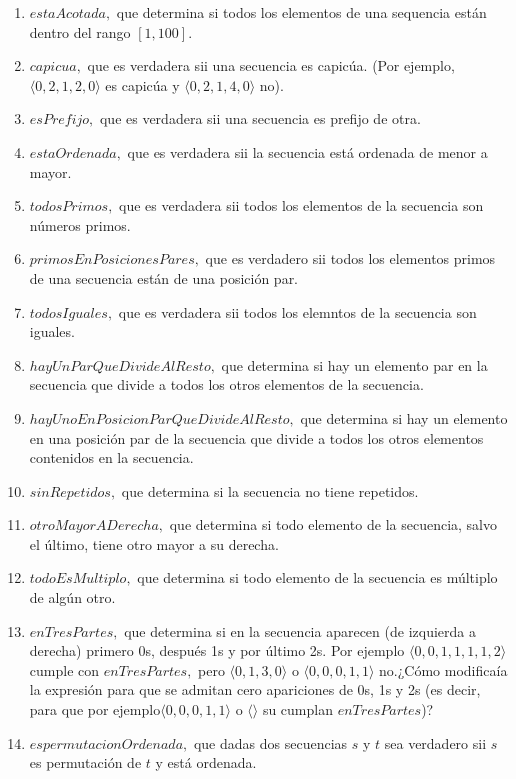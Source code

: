 \documentclass[a4paper]{article}
\begin{document}
\begin{enumerate}[label=\alph*)]
\item $estaAcotada,$ que determina si todos los elementos de una sequencia están dentro del rango $[1,100]$.
\item $capicua,$ que es verdadera sii una secuencia es capicúa. (Por ejemplo, $\langle 0,2,1,2,0 \rangle$ es capicúa y $\langle 0,2,1,4,0\rangle$ no).
\item $esPrefijo,$ que es verdadera sii una secuencia es prefijo de otra.
\item $estaOrdenada,$ que es verdadera sii la secuencia está ordenada de menor a mayor.
\item $todosPrimos,$ que es verdadera sii todos los elementos de la secuencia son números primos.
\item $primosEnPosicionesPares,$ que es verdadero sii todos los elementos primos de una secuencia están de una posición par.
\item $todosIguales,$ que es verdadera sii todos los elemntos de la secuencia son iguales.
\item $hayUnParQueDivideAlResto,$ que determina si hay un elemento par en la secuencia que divide a todos los otros elementos de la secuencia.
\item $hayUnoEnPosicionParQueDivideAlResto,$ que determina si hay un elemento en una posición par de la secuencia que divide a todos los otros elementos contenidos en la secuencia.
\item $sinRepetidos,$ que determina si la secuencia no tiene repetidos.
\item $otroMayorADerecha,$ que determina si todo elemento de la secuencia, salvo el último, tiene otro mayor a su derecha.
\item $todoEsMultiplo,$ que determina si todo elemento de la secuencia es múltiplo de algún otro.
\item $enTresPartes,$ que determina si en la secuencia aparecen (de izquierda a derecha) primero 0s, después 1s y por último 2s. Por ejemplo $\langle 0,0,1,1,1,1,2\rangle$ cumple con $enTresPartes,$ pero $\langle 0,1,3,0\rangle$ o $\langle 0,0,0,1,1\rangle$ no.¿Cómo modificaía la expresión para que se admitan cero apariciones de 0s, 1s y 2s (es decir, para que por ejemplo$\langle 0,0,0,1,1\rangle$ o $\langle \rangle$ su cumplan $enTresPartes$)?
\item $espermutacionOrdenada,$ que dadas dos secuencias $s$ y $t$ sea verdadero sii $s$ es permutación de $t$ y está ordenada.
\end{enumerate} 
\end{document}
